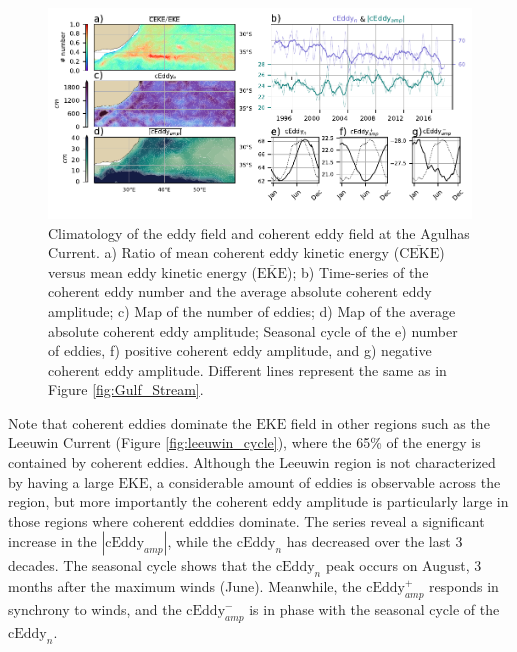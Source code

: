 \documentclass[draft,linenumbers]{agujournal2019}
\newcommand{\MEKE}{\overline{\textrm{EKE}}}
\newcommand{\EKE}{\textrm{EKE}}
\newcommand{\MCEKE}{\overline{\textrm{CEKE}}}
\newcommand{\cEddy}{\textrm{cEddy}}
\begin{document}
	\begin{figure}
	    \centering
	    \includegraphics[width=1\textwidth]{figures/regional_ratios_and_stats_V3_2.pdf}
	    \caption{Climatology of the eddy field and coherent eddy field at the Agulhas Current. a) Ratio of mean coherent eddy kinetic energy ($\MCEKE$) versus mean eddy kinetic energy ($\MEKE$); b) Time-series of the coherent eddy number and the average absolute coherent eddy amplitude; c) Map of the number of eddies; d) Map of the average absolute coherent eddy amplitude; Seasonal cycle of the e) number of eddies, f) positive coherent eddy amplitude, and g) negative coherent eddy amplitude. Different lines represent the same as in Figure \ref{fig:Gulf_Stream}.}
	    \label{fig:Agulhas}
	\end{figure}


	Note that coherent eddies dominate the $\EKE$ field in other regions such as the Leeuwin Current (Figure \ref{fig:leeuwin_cycle}), where the 65\% of the energy is contained by coherent eddies. 
	Although the Leeuwin region is not characterized by having a large $\EKE$, a considerable amount of eddies is observable across the region, but more importantly the coherent eddy amplitude is particularly large in those regions where coherent edddies dominate. 
	The series reveal a significant increase in the $|\cEddy_{amp}|$, while the $\cEddy_{n}$ has decreased over the last 3 decades. The seasonal cycle shows that the $\cEddy_{n}$ peak occurs on August, 3 months after the maximum winds (June). Meanwhile, the $\cEddy_{amp}^+$ responds in synchrony to winds, and the $\cEddy_{amp}^-$ is in phase with the seasonal cycle of the $\cEddy_{n}$. 
 		
\end{document}
